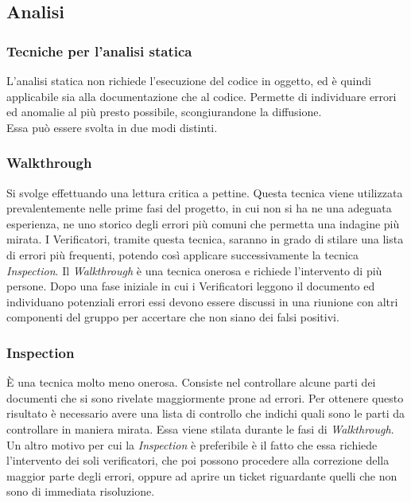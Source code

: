 \documentclass[a4paper]{article}
\begin{document}
		\subsection{Analisi}
			\subsubsection{Tecniche per l'analisi statica}
				L'analisi statica non richiede l'esecuzione del codice in oggetto, ed è quindi applicabile sia 
				alla documentazione che al codice. Permette di individuare errori ed anomalie al più presto possibile, 
				scongiurandone la diffusione. \\ Essa può essere svolta in due modi distinti.
				\subsubsection{Walkthrough}
					Si svolge effettuando una lettura critica a pettine. Questa tecnica viene utilizzata prevalentemente 
					nelle prime fasi del progetto, in cui non si ha ne una adeguata esperienza, ne uno storico degli errori 
					più comuni che permetta una indagine più mirata. I Verificatori, tramite questa tecnica, saranno in 
					grado di stilare una lista di errori più frequenti, potendo così applicare successivamente la tecnica 
					\emph{Inspection}. Il \emph{Walkthrough} è una tecnica onerosa e richiede l'intervento di più persone. 
					Dopo una fase iniziale in cui i Verificatori leggono il documento ed individuano potenziali errori essi 
					devono essere discussi in una riunione con altri componenti del gruppo per accertare che non siano dei 
					falsi positivi.
				\subsubsection{Inspection}
					È una tecnica molto meno onerosa. Consiste nel controllare alcune parti dei documenti che si sono rivelate 
					maggiormente prone ad errori. Per ottenere questo risultato è necessario avere una lista di controllo che 
					indichi quali sono le parti da controllare in maniera mirata. Essa viene stilata durante le fasi di 
					\emph{Walkthrough}. Un altro motivo per cui la \emph{Inspection} è preferibile è il fatto che essa richiede 
					l'intervento dei soli verificatori, che poi possono procedere alla correzione della maggior parte degli errori, 
					oppure ad aprire un ticket riguardante quelli che non sono di immediata risoluzione.\\
					
\end{document}
